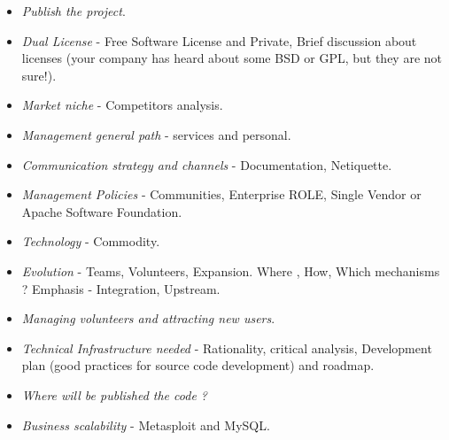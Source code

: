 \documentclass[11pt]{scrartcl}
\begin{document}
\begin{itemize}
	\item \emph{Publish the project}.
	\item \emph{Dual License} - Free Software License and Private, Brief discussion about licenses (your company has heard about some BSD or GPL, but they are not sure!).
	\item \emph{Market niche} - Competitors analysis.
	\item \emph{Management general path} - services and personal.
	\item \emph{Communication strategy and channels} - Documentation, Netiquette.
	\item \emph{Management Policies} - Communities, Enterprise ROLE, Single Vendor or Apache Software Foundation.
	\item \emph{Technology} - Commodity.
	\item \emph{Evolution} - Teams, Volunteers, Expansion. Where , How, Which mechanisms ? Emphasis - Integration, Upstream.
	\item \emph{Managing volunteers and attracting new users}.
	\item \emph{Technical Infrastructure needed} - Rationality, critical analysis, Development plan (good practices for source code development) and roadmap.
	\item \emph{Where will be published the code ?}
	\item \emph{Business scalability} - Metasploit and MySQL.
\end{itemize}
\end{document}
